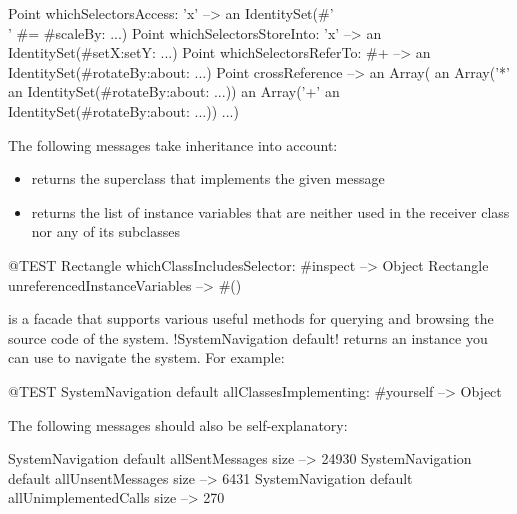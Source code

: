 \documentclass[a4paper,10pt,twoside]{book}
\begin{document}
\begin{code}{} %
Point whichSelectorsAccess: 'x'    --> an IdentitySet(#'\\' #= #scaleBy: ...)
Point whichSelectorsStoreInto: 'x' --> an IdentitySet(#setX:setY: ...)
Point whichSelectorsReferTo: #+  --> an IdentitySet(#rotateBy:about: ...)
Point crossReference --> an Array(
		an Array('*' an IdentitySet(#rotateBy:about: ...))
		an Array('+' an IdentitySet(#rotateBy:about: ...))
		...)
\end{code}

The following messages take inheritance into account:
\begin{itemize}
\item {} returns the superclass that implements the given message
\item {} returns the list of instance variables that are neither used in the receiver class nor any of its subclasses
\end{itemize}

\begin{code}{@TEST}
Rectangle whichClassIncludesSelector: #inspect --> Object
Rectangle unreferencedInstanceVariables            --> #()
\end{code}

 is a facade that supports various useful methods for querying and browsing the source code of the system.
\ct!SystemNavigation default! returns an instance you can use to navigate the system.
For example:

\begin{code}{@TEST}
SystemNavigation default allClassesImplementing: #yourself --> {Object}
\end{code}


The following messages should also be self-explanatory:

\begin{code}{}
SystemNavigation default allSentMessages size          --> 24930
SystemNavigation default allUnsentMessages size      --> 6431
SystemNavigation default allUnimplementedCalls size --> 270
\end{code}
\end{document}

